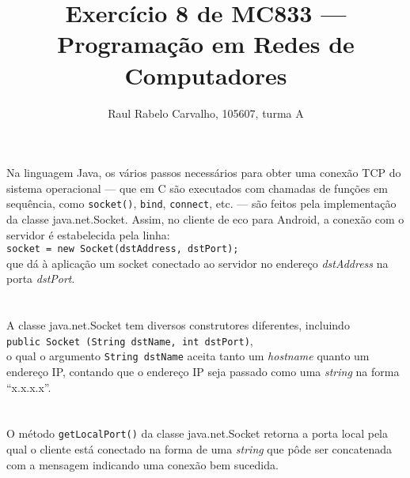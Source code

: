 \documentclass[a4paper,10pt,oneside,final,titlepage,onecolumn]{article}
\title{Exercício 8 de MC833 --- Programação em Redes de Computadores}
\author{Raul Rabelo Carvalho, 105607, turma A}
\begin{document}
\maketitle



\section{}
\paragraph{}Na linguagem Java, os vários passos necessários para obter uma conexão TCP do sistema operacional --- que em C são executados com chamadas de funções em sequência, como \verb|socket()|, \verb|bind|, \verb|connect|, etc. --- são feitos pela implementação da classe java.net.Socket. Assim, no cliente de eco para Android, a conexão com o servidor é estabelecida pela linha:
\\\verb|socket = new Socket(dstAddress, dstPort);|
\\que dá à aplicação um socket conectado ao servidor no endereço \emph{dstAddress} na porta \emph{dstPort}.



\FloatBarrier
\section{}
\paragraph{}A classe java.net.Socket tem diversos construtores diferentes, incluindo\\
\verb|public Socket (String dstName, int dstPort)|,\\
o qual o argumento \verb|String dstName| aceita tanto um \emph{hostname} quanto um endereço IP, contando que o endereço IP seja passado como uma \emph{string} na forma ``x.x.x.x''.



\FloatBarrier
\section{}
\paragraph{}O método \verb|getLocalPort()| da classe java.net.Socket retorna a porta local pela qual o cliente está conectado na forma de uma \emph{string} que pôde ser concatenada com a mensagem indicando uma conexão bem sucedida.
\end{document}
